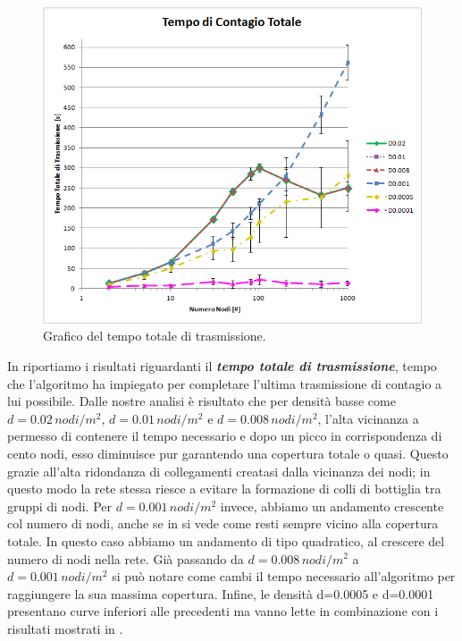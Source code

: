 \begin{figure}[t]
	\centering
	\includegraphics[width=0.9\linewidth]{Images/risultati/tempo_totale}
	\caption[Tempo totale di trasmissione]{Grafico del tempo totale di trasmissione.}
	\label{fig:tempo_totale}
\end{figure}
In  riportiamo i risultati riguardanti il \textbf{\textit{tempo totale di trasmissione}}, tempo che l'algoritmo ha impiegato per completare l'ultima trasmissione di contagio a lui possibile. Dalle nostre analisi è risultato che per densità basse come $d=0.02\, nodi/m^2$, $d=0.01\, nodi/m^2$ e $d=0.008\, nodi/m^2$, l'alta vicinanza a permesso di contenere il tempo necessario e dopo un picco in corrispondenza di cento nodi, esso diminuisce pur garantendo una copertura totale o quasi. Questo grazie all'alta ridondanza di collegamenti creatasi dalla vicinanza dei nodi; in questo modo la rete stessa riesce a evitare la formazione di colli di bottiglia tra gruppi di nodi. Per $d=0.001\, nodi/m^2$ invece, abbiamo un andamento crescente col numero di nodi, anche se in  si vede come resti sempre vicino alla copertura totale.  In questo caso abbiamo un andamento di tipo quadratico, al crescere del numero di nodi nella rete. Già passando da $d=0.008\, nodi/m^2$ a $d=0.001\, nodi/m^2$ si può notare come cambi il tempo necessario all'algoritmo per raggiungere la sua massima copertura. Infine, le densità d=0.0005 e d=0.0001 presentano curve inferiori alle precedenti ma vanno lette in combinazione con i risultati mostrati in . 
